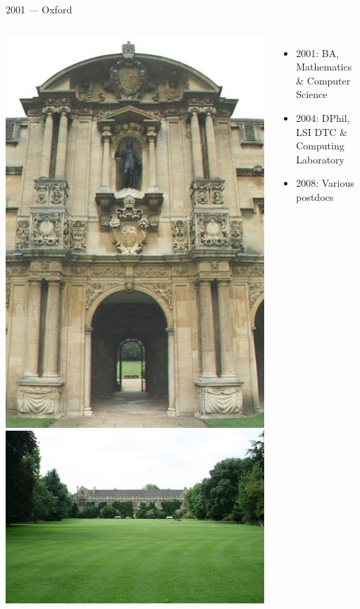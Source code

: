 \documentclass[t,xcolor={usenames,dvipsnames}]{beamer}
\begin{document}
\begin{frame}{2001 --- Oxford}
\begin{columns}[T]
\includegraphics[width=.99\textwidth]{sjc1}
\hspace{.05\textwidth}
\includegraphics[width=.9\textwidth]{sjc2}
\begin{itemize}
\item 2001: BA, Mathematics \& Computer Science
\item 2004: DPhil, LSI DTC \& Computing Laboratory
\item 2008: Various postdocs
\end{itemize}
\end{columns}
\end{frame}
\end{document}
